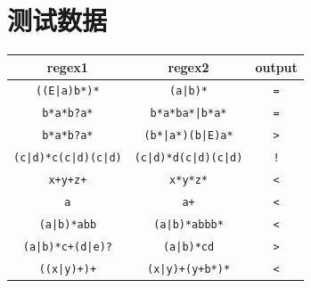\documentclass[logo,reportComp]{thesis}
\begin{document}
\section{测试数据}
\begin{center}
\begin{tabular}{|c|c|c|}\hline
\textbf{regex1} & \textbf{regex2} & \textbf{output}\\\hline
\verb'((E|a)b*)*' & \verb'(a|b)*' & \verb'='\\\hline
\verb'b*a*b?a*' & \verb'b*a*ba*|b*a*' & \verb'='\\\hline
\verb'b*a*b?a*' & \verb'(b*|a*)(b|E)a*' & \verb'>'\\\hline
\verb'(c|d)*c(c|d)(c|d)' & \verb'(c|d)*d(c|d)(c|d)' & \verb'!'\\\hline
\verb'x+y+z+' & \verb'x*y*z*' & \verb'<'\\\hline
\verb'a' & \verb'a+' & \verb'<'\\\hline
\verb'(a|b)*abb' & \verb'(a|b)*abbb*' & \verb'<'\\\hline
\verb'(a|b)*c+(d|e)?' & \verb'(a|b)*cd' & \verb'>'\\\hline
\verb'((x|y)+)+' & \verb'(x|y)+(y+b*)*' & \verb'<'\\\hline
\end{tabular}
\end{center}
\end{document}
